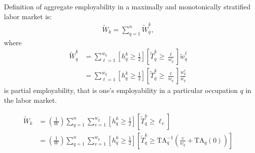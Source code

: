 \documentclass[hidelinks, nonatbib]{elsarticle}
\begin{document}
% 

Definition of aggregate employability in a maximally and monotonically stratified labor market is: 
\begin{gather}
    \tilde{W}_{k}
    =
    \sum_{q=1}^{n}
    \tilde{W}_{q}^{k}
    ,
\end{gather}
where
\begin{align}
    \tilde{W}_{q}^{k}
    &=
    \sum_{\ell=1}^{w_q}
    \left[
        h_{q}^{k}
        \geq
        \frac{1}{2}
    \right]
    \left[
        \tilde{T}_{q}^{k}
        \geq 
        \frac{\ell}{w_q}
    \right]
    \tilde{w}_{q}^{\ell}
    \\
    &=
    \sum_{\ell=1}^{w_q}
    \left[
        h_{q}^{k}
        \geq
        \frac{1}{2}
    \right]
    \left[
        \tilde{T}_{q}^{k}
        \geq 
        \frac{\ell}{w_q}
    \right]
    \frac{
        {w}_{q}^{\ell}
    }{
        w_q
    }
\end{align}
is partial employability, that is one's employability in a particular occupation $q$ in the labor market.

\begin{align}
    \tilde{W}_k 
    &=
    \left(
        \frac{1}{W}
    \right)
    \sum_{q=1}^{n}
    \sum_{v=1}^{w_q}
    \left[
        h_{q}^{k}
        \geq
        \frac{1}{2}
    \right]
    \left[
        \tilde{T}_{q}^{k}
        \geq
        \ell_v
    \right]
    \\
    &=
    \left(
        \frac{1}{W}
    \right)
    \sum_{q=1}^{n}
    \sum_{v=1}^{w_q}
    \left[
        h_{q}^{k}
        \geq
        \frac{1}{2}
    \right]
    \left[
        \tilde{T}_{q}^{k}
        \geq
        \text{TA}_{q}^{-1}
        \left(
            \frac{v}{w_q}
            +
            \text{TA}_{q}(0)
        \right)
    \right]
\end{align}
\end{document}
